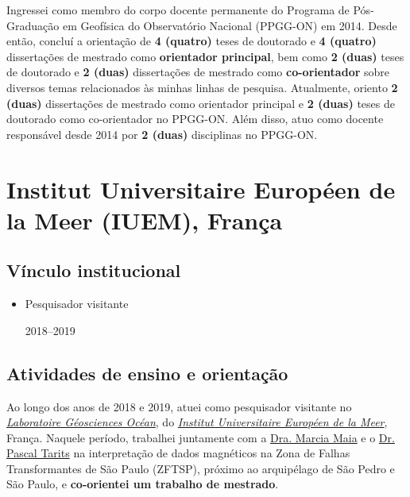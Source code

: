 Ingressei como membro do corpo docente permanente do Programa de Pós-Graduação em
Geofísica do Observatório Nacional (PPGG-ON) em 2014. Desde então, 
concluí a orientação de \textbf{4 (quatro)} teses de doutorado e 
\textbf{4 (quatro)} dissertações de mestrado como \textbf{orientador principal},
bem como \textbf{2 (duas)} teses de doutorado e \textbf{2 (duas)} dissertações de
mestrado como \textbf{co-orientador} sobre diversos temas relacionados às minhas
linhas de pesquisa. Atualmente, oriento \textbf{2 (duas)} dissertações de mestrado
como orientador principal e \textbf{2 (duas)} teses de doutorado como co-orientador
no PPGG-ON. 
Além disso, atuo como docente responsável desde 2014 por \textbf{2 (duas)} disciplinas 
no PPGG-ON.


\section{Institut Universitaire Européen de la Meer (IUEM), França}


\subsection*{Vínculo institucional}


\begin{itemize}
	
	\item[\parbox{0.03\textwidth}{\vspace{-0.3\baselineskip}\faClipboardCheck}]
	{Pesquisador visitante \dotfill \parbox{0.11\textwidth}{\hfill 2018--2019}} 
	
\end{itemize}

\subsection*{Atividades de ensino e orientação}

Ao longo dos anos de 2018 e 2019, atuei como pesquisador visitante no 
\href{https://www-iuem.univ-brest.fr/lgo/le-labo/}{\textit{Laboratoire Géosciences Océan}}, 
do
\href{https://www-iuem.univ-brest.fr/}{\textit{Institut Universitaire Européen de la Meer}},
França.
Naquele período, trabalhei juntamente com a 
\href{https://www-iuem.univ-brest.fr/lgo/equipe/maia-marcia-do-carmo/}{Dra. Marcia Maia} 
e o 
\href{https://www-iuem.univ-brest.fr/lgo/equipe/tarits-pascal/}{Dr. Pascal Tarits} 
na interpretação de dados magnéticos na Zona de Falhas Transformantes de São
Paulo (ZFTSP), próximo ao arquipélago de São Pedro e São Paulo, e
\textbf{co-orientei um trabalho de mestrado}.



